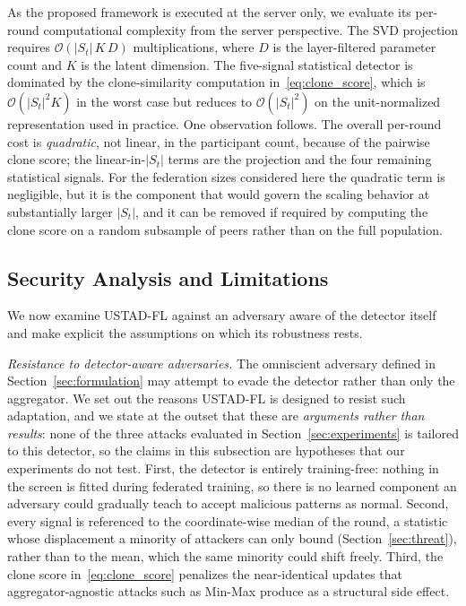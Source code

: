 \documentclass[journal]{IEEEtran}
\begin{document}
As the proposed framework is executed at the server only, we evaluate its per-round computational complexity from the server perspective. The SVD projection requires $\mathcal{O}(|S_t|\,K\,D)$ multiplications, where $D$ is the layer-filtered parameter count and $K$ is the latent dimension. The five-signal statistical detector is dominated by the clone-similarity computation in~\eqref{eq:clone_score}, which is $\mathcal{O}(|S_t|^2 K)$ in the worst case but reduces to $\mathcal{O}(|S_t|^2)$ on the unit-normalized representation used in practice. One observation follows. The overall per-round cost is \emph{quadratic}, not linear, in the participant count, because of the pairwise clone score; the linear-in-$|S_t|$ terms are the projection and the four remaining statistical signals. For the federation sizes considered here the quadratic term is negligible, but it is the component that would govern the scaling behavior at substantially larger $|S_t|$, and it can be removed if required by computing the clone score on a random subsample of peers rather than on the full population.

\subsection{Security Analysis and Limitations}
\label{sec:security}
We now examine USTAD-FL against an adversary aware of the detector itself and make explicit the assumptions on which its robustness rests.

\noindent\textit{Resistance to detector-aware adversaries.} The omniscient adversary defined in Section~\ref{sec:formulation} may attempt to evade the detector rather than only the aggregator. We set out the reasons USTAD-FL is designed to resist such adaptation, and we state at the outset that these are \emph{arguments rather than results}: none of the three attacks evaluated in Section~\ref{sec:experiments} is tailored to this detector, so the claims in this subsection are hypotheses that our experiments do not test. First, the detector is entirely training-free: nothing in the screen is fitted during federated training, so there is no learned component an adversary could gradually teach to accept malicious patterns as normal. Second, every signal is referenced to the coordinate-wise median of the round, a statistic whose displacement a minority of attackers can only bound (Section~\ref{sec:threat}), rather than to the mean, which the same minority could shift freely. Third, the clone score in~\eqref{eq:clone_score} penalizes the near-identical updates that aggregator-agnostic attacks such as Min-Max produce as a structural side effect.
\end{document}
